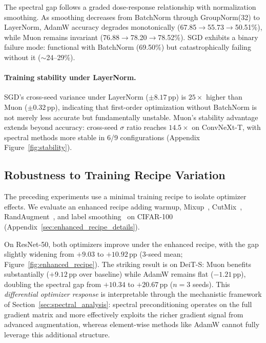 The spectral gap follows a graded dose-response relationship with normalization smoothing. As smoothing decreases from BatchNorm through GroupNorm(32) to LayerNorm, AdamW accuracy degrades monotonically (67.85$\to$55.73$\to$50.51\%), while Muon remains invariant (76.88$\to$78.20$\to$78.52\%). SGD exhibits a binary failure mode: functional with BatchNorm (69.50\%) but catastrophically failing without it ($\sim$24--29\%).

\paragraph{Training stability under LayerNorm.}
SGD's cross-seed variance under LayerNorm ($\pm 8.17$\,pp) is $25\times$ higher than Muon ($\pm 0.32$\,pp), indicating that first-order optimization without BatchNorm is not merely less accurate but fundamentally unstable.
Muon's stability advantage extends beyond accuracy: cross-seed $\sigma$ ratio reaches $14.5\times$ on ConvNeXt-T, with spectral methods more stable in 6/9 configurations (Appendix Figure~\ref{fig:stability}).

\subsection{Robustness to Training Recipe Variation}
\label{sec:recipe_robustness}

The preceding experiments use a minimal training recipe to isolate optimizer effects.
We evaluate an enhanced recipe adding warmup, Mixup~\cite{zhang2018mixup}, CutMix~\cite{yun2019cutmix}, RandAugment~\cite{cubuk2020randaugment}, and label smoothing~\cite{szegedy2016rethinking} on CIFAR-100 (Appendix~\ref{sec:enhanced_recipe_details}).



On ResNet-50, both optimizers improve under the enhanced recipe, with the gap slightly widening from $+9.03$ to $+10.92$\,pp (3-seed mean; Figure~\ref{fig:enhanced_recipe}).
The striking result is on DeiT-S: Muon benefits substantially ($+9.12$\,pp over baseline) while AdamW remains flat ($-1.21$\,pp), doubling the spectral gap from $+10.34$ to $+20.67$\,pp ($n{=}3$ seeds).
This \emph{differential optimizer response} is interpretable through the mechanistic framework of Section~\ref{sec:spectral_analysis}: spectral preconditioning operates on the full gradient matrix and more effectively exploits the richer gradient signal from advanced augmentation, whereas element-wise methods like AdamW cannot fully leverage this additional structure.

